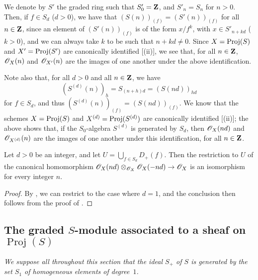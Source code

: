 \begin{env}[2.5.16]
\label{II.2.5.16}
We denote by $S'$ the graded ring such that $S'_0=\mathbf{Z}$, and $S'_n=S_n$ for $n>0$.
Then, if $f\in S_d$ ($d>0$), we have that $(S(n))_{(f)}=(S'(n))_{(f)}$ for all $n\in\mathbf{Z}$, since an element of $(S'(n))_{(f)}$ is of the form $x/f^k$, with $x\in S'_{n+kd}$ ($k>0$), and we can always take $k$ to be such that $n+kd\neq0$.
Since $X=\operatorname{Proj}(S)$ and $X'=\operatorname{Proj}(S')$ are canonically identified [(ii)], we see that, for all $n\in\mathbf{Z}$, $\mathscr{O}_X(n)$ and $\mathscr{O}_{X'}(n)$ are the images of one another under the above identification.

Note also that, for all $d>0$ and all $n\in\mathbf{Z}$, we have
\[
  (S^{(d)}(n))_h = S_{(n+h)d} = (S(nd))_{hd}
\]
for $f\in S_d$, and thus $(S^{(d)}(n))_{(f)}=(S(nd))_{(f)}$.
We know that the schemes $X=\operatorname{Proj}(S)$ and $X^{(d)}=\operatorname{Proj}(S^{(d)})$ are canonically identified [(ii)];
the above shows that, if the $S_0$-algebra $S^{(d)}$ is generated by $S_d$, then $\mathscr{O}_X(nd)$ and $\mathscr{O}_{X^{(d)}}(n)$ are the images of one another under this identification, for all $n\in\mathbf{Z}$.
\end{env}

\begin{proposition}[2.5.17]
\label{II.2.5.17}
Let $d>0$ be an integer, and let $U=\bigcup_{f\in S_d}D_+(f)$.
Then the restriction to $U$ of the canonical homomorphism $\sh{O}_X(nd)\otimes_{\sh{O}_X}\sh{O}_X(-nd)\to\sh{O}_X$ is an isomorphism for every integer $n$.
\end{proposition}

\begin{proof}
By , we can restrict to the case where $d=1$, and the conclusion then follows from the proof of .
\end{proof}


\subsection{The graded $S$-module associated to a sheaf on $\operatorname{Proj}(S)$}
\label{subsection:II.2.6}

\emph{We suppose all throughout this section that the ideal $S_+$ of $S$ is generated by the set $S_1$ of homogeneous elements of degree~$1$.}

